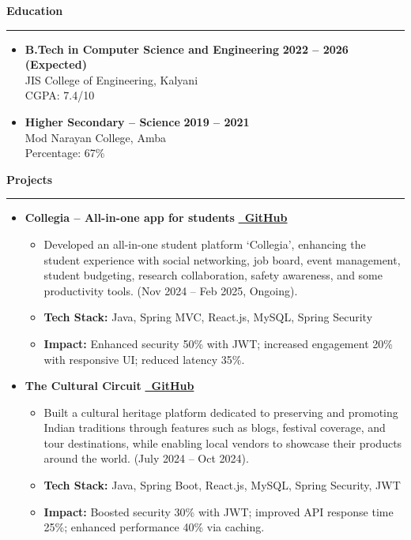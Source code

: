 \documentclass[11pt,a4paper]{article}
\newcommand{\sectionheading}[1]{%
    \vspace{0.5em}%
    {\large\headingfont\color{primary}\textbf{#1}}%
    \vspace{0.25em}%
    \hrule%
    \vspace{0.5em}%
}
\newenvironment{cvitemize}{%
    \begin{itemize}[leftmargin=1.5em, nosep, noitemsep]
}{%
    \end{itemize}
}
\begin{document}
\sectionheading{Education}
\begin{cvitemize}
    \item \textbf{B.Tech in Computer Science and Engineering} \hfill \textbf{2022 -- 2026 (Expected)} \\
          JIS College of Engineering, Kalyani \\
          CGPA: 7.4/10
    \item \textbf{Higher Secondary -- Science} \hfill \textbf{2019 -- 2021} \\
          Mod Narayan College, Amba \\ 
          Percentage: 67\%
\end{cvitemize}

\sectionheading{Projects}
\begin{cvitemize}

    \item \textbf{Collegia -- All-in-one app for students} \hfill \href{https://github.com/K-Nishant-18/collegia}{\color{primary}\textbf{\faGithub\ GitHub}}
    \begin{cvitemize}
        \item Developed an all-in-one student platform ‘Collegia', enhancing the student experience with social networking, job board, event management, student budgeting, research collaboration, safety awareness, and some productivity tools. (Nov 2024 -- Feb 2025, Ongoing).
        \item \textbf{Tech Stack:} Java, Spring MVC, React.js, MySQL, Spring Security
        \item \textbf{Impact:} Enhanced security 50\% with JWT; increased engagement 20\% with responsive UI; reduced latency 35\%.
    \end{cvitemize}

     \vspace{0.7em} %

    \item \textbf{The Cultural Circuit} \hfill \href{https://github.com/K-Nishant-18/cultural-circuit}{\color{primary}\textbf{\faGithub\ GitHub}}
    \begin{cvitemize}
        \item Built a cultural heritage platform dedicated to preserving and promoting Indian traditions through features such as blogs, festival coverage, and tour destinations, while enabling local vendors to showcase their products around the world. (July 2024 -- Oct 2024).
        \item \textbf{Tech Stack:} Java, Spring Boot, React.js, MySQL, Spring Security, JWT
        \item \textbf{Impact:} Boosted security 30\% with JWT; improved API response time 25\%; enhanced performance 40\% via caching.
    \end{cvitemize}

\end{cvitemize}
\end{document}
